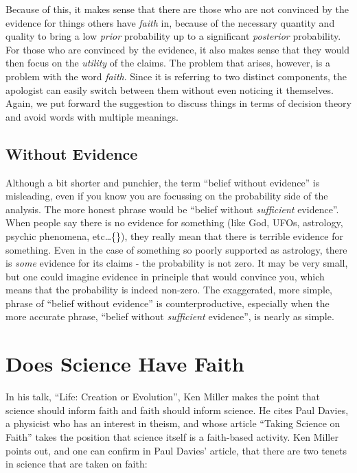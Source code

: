 \documentclass{tufte-book}
\begin{document}
Because of this, it makes sense that there are those who are not
convinced by the evidence for things others have \emph{faith} in,
because of the necessary quantity and quality to bring a low
\emph{prior} probability up to a significant \emph{posterior}
probability. For those who are convinced by the evidence, it also makes
sense that they would then focus on the \emph{utility} of the claims.
The problem that arises, however, is a problem with the word
\emph{faith}. Since it is referring to two distinct components, the
apologist can easily switch between them without even noticing it
themselves. Again, we put forward the suggestion to discuss things in
terms of decision theory and avoid words with multiple meanings.

\subsection{Without Evidence}

Although a bit shorter and punchier, the term ``belief without
evidence'' is misleading, even if you know you are focussing on the
probability side of the analysis. The more honest phrase would be
``belief without \emph{sufficient} evidence''. When people say there is
no evidence for something (like God, UFOs, astrology, psychic phenomena,
etc\ldots\{\}), they really mean that there is terrible evidence for
something. Even in the case of something so poorly supported as
astrology, there is \emph{some} evidence for its claims - the
probability is not zero. It may be very small, but one could imagine
evidence in principle that would convince you, which means that the
probability is indeed non-zero. The exaggerated, more simple, phrase of
``belief without evidence'' is counterproductive, especially when the
more accurate phrase, ``belief without \emph{sufficient} evidence'', is
nearly as simple.

\section{Does Science Have Faith}\label{does-science-have-faith}

In his talk, ``Life: Creation or Evolution''\citep{Miller:2009aa}, Ken
Miller makes the point that science should inform faith and faith should
inform science. He cites Paul Davies, a physicist who has an interest in
theism, and whose article ``Taking Science on
Faith''\citep{davies2007taking} takes the position that science itself
is a faith-based activity. Ken Miller points out, and one can confirm in
Paul Davies' article, that there are two tenets in science that are
taken on faith:
\end{document}
